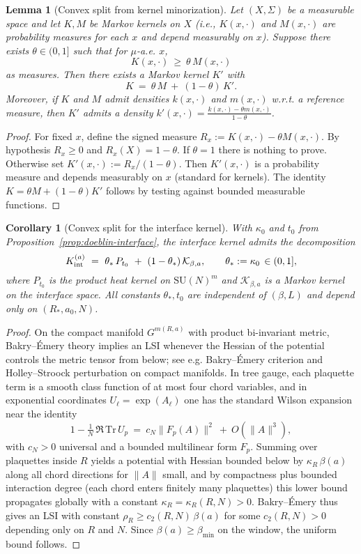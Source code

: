 \documentclass[11pt]{amsart}
\theoremstyle{plain}
\newtheorem{lemma}[theorem]{Lemma}
\newtheorem{corollary}[theorem]{Corollary}
\theoremstyle{definition}
\theoremstyle{remark}
\begin{document}
\begin{lemma}[Convex split from kernel minorization]\label{lem:convex-split}
Let $(X,\Sigma)$ be a measurable space and let $K,M$ be Markov kernels on $X$ (i.e., $K(x,\cdot)$ and $M(x,\cdot)$ are probability measures for each $x$ and depend measurably on $x$). Suppose there exists $\theta\in(0,1]$ such that for $\mu$-a.e. $x$,
\[
  K(x,\cdot)\ \ge\ \theta\, M(x,\cdot)
\]
as measures. Then there exists a Markov kernel $K'$ with
\[
  K\ =\ \theta\,M\ +\ (1-\theta)\,K'.
\]
Moreover, if $K$ and $M$ admit densities $k(x,\cdot)$ and $m(x,\cdot)$ w.r.t. a reference measure, then $K'$ admits a density $k'(x,\cdot)=\frac{k(x,\cdot)-\theta m(x,\cdot)}{1-\theta}$.
\end{lemma}

\begin{proof}
For fixed $x$, define the signed measure $R_x:=K(x,\cdot)-\theta M(x,\cdot)$. By hypothesis $R_x\ge 0$ and $R_x(X)=1-\theta$. If $\theta=1$ there is nothing to prove. Otherwise set $K'(x,\cdot):=R_x/(1-\theta)$. Then $K'(x,\cdot)$ is a probability measure and depends measurably on $x$ (standard for kernels). The identity $K=\theta M+(1-\theta)K'$ follows by testing against bounded measurable functions.
\end{proof}

\begin{corollary}[Convex split for the interface kernel]\label{cor:convex-split-interface}
With $\kappa_0$ and $t_0$ from Proposition~\ref{prop:doeblin-interface}, the interface kernel admits the decomposition
\[
  K_{\rm int}^{(a)}\ =\ \theta_*\,P_{t_0}\ +\ (1-\theta_*)\,\mathcal K_{\beta,a},\qquad \theta_*:=\kappa_0\,\in(0,1],
\]
where $P_{t_0}$ is the product heat kernel on $\mathrm{SU}(N)^m$ and $\mathcal K_{\beta,a}$ is a Markov kernel on the interface space. All constants $\theta_*,t_0$ are independent of $(\beta,L)$ and depend only on $(R_*,a_0,N)$.
\end{corollary}

\begin{proof}
On the compact manifold $G^{m(R,a)}$ with product bi-invariant metric, Bakry--Émery theory implies an LSI whenever the Hessian of the potential controls the metric tensor from below; see e.g. Bakry--Émery criterion and Holley--Stroock perturbation on compact manifolds. In tree gauge, each plaquette term is a smooth class function of at most four chord variables, and in exponential coordinates $U_\ell=\exp(A_\ell)$ one has the standard Wilson expansion near the identity
\[
  1-\tfrac{1}{N}\,\Re\,\mathrm{Tr}\,U_p\ =\ c_N\|F_p(A)\|^2\ +\ O(\|A\|^3),
\]
with $c_N>0$ universal and a bounded multilinear form $F_p$. Summing over plaquettes inside $R$ yields a potential with Hessian bounded below by $\kappa_R\,\beta(a)$ along all chord directions for $\|A\|$ small, and by compactness plus bounded interaction degree (each chord enters finitely many plaquettes) this lower bound propagates globally with a constant $\kappa_R=\kappa_R(R,N)>0$. Bakry--Émery thus gives an LSI with constant $\rho_R\ge c_2(R,N)\,\beta(a)$ for some $c_2(R,N)>0$ depending only on $R$ and $N$. Since $\beta(a)\ge \beta_{\min}$ on the window, the uniform bound follows.
\end{proof}
\end{document}
